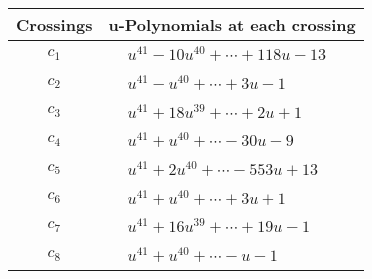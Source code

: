 \documentclass[1p]{elsarticle_modified}
\theoremstyle{definition}
\begin{document}
\begin{tabular}{m{50pt}|m{274pt}}
Crossings & \hspace{64pt}u-Polynomials at each crossing \\
\hline $$\begin{aligned}c_{1}\end{aligned}$$&$\begin{aligned}
&u^{41}-10 u^{40}+\cdots+118 u-13
\end{aligned}$\\
\hline $$\begin{aligned}c_{2}\end{aligned}$$&$\begin{aligned}
&u^{41}- u^{40}+\cdots+3 u-1
\end{aligned}$\\
\hline $$\begin{aligned}c_{3}\end{aligned}$$&$\begin{aligned}
&u^{41}+18 u^{39}+\cdots+2 u+1
\end{aligned}$\\
\hline $$\begin{aligned}c_{4}\end{aligned}$$&$\begin{aligned}
&u^{41}+u^{40}+\cdots-30 u-9
\end{aligned}$\\
\hline $$\begin{aligned}c_{5}\end{aligned}$$&$\begin{aligned}
&u^{41}+2 u^{40}+\cdots-553 u+13
\end{aligned}$\\
\hline $$\begin{aligned}c_{6}\end{aligned}$$&$\begin{aligned}
&u^{41}+u^{40}+\cdots+3 u+1
\end{aligned}$\\
\hline $$\begin{aligned}c_{7}\end{aligned}$$&$\begin{aligned}
&u^{41}+16 u^{39}+\cdots+19 u-1
\end{aligned}$\\
\hline $$\begin{aligned}c_{8}\end{aligned}$$&$\begin{aligned}
&u^{41}+u^{40}+\cdots- u-1
\end{aligned}$\\

\end{tabular}
\end{document}
